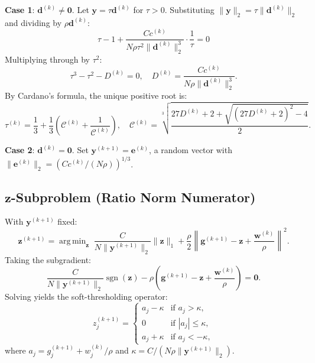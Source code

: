 \documentclass{uai2026} %
\theoremstyle{definition}
\theoremstyle{remark}
\newcommand{\bz}{\mathbf{z}}
\newcommand{\bg}{\mathbf{g}}
\newcommand{\bw}{\mathbf{w}}
\newcommand{\by}{\mathbf{y}}
\newcommand{\bd}{\mathbf{d}}
\newcommand{\be}{\mathbf{e}}
\DeclareMathOperator{\sgn}{sgn}
\DeclareMathOperator*{\argmin}{arg\,min}
\begin{document}
\textbf{Case 1}: $\bd^{(k)} \neq \mathbf{0}$.
Let $\by = \tau\bd^{(k)}$ for $\tau > 0$.
Substituting $\lVert\by\rVert_2 = \tau\lVert\bd^{(k)}\rVert_2$ and dividing by $\rho\bd^{(k)}$:
\begin{equation}
    \tau - 1 + \frac{Cc^{(k)}}{N\rho\tau^2\lVert\bd^{(k)}\rVert_2^3}\cdot\frac{1}{\tau} = 0
\end{equation}
Multiplying through by $\tau^2$:
\begin{equation}
    \tau^3 - \tau^2 - D^{(k)} = 0,\quad D^{(k)} = \frac{Cc^{(k)}}{N\rho\lVert\bd^{(k)}\rVert_2^3}.
\end{equation}
By Cardano's formula, the unique positive root is:
\begin{equation}
    \tau^{(k)} = \frac{1}{3} + \frac{1}{3}\left(\mathcal{C}^{(k)} + \frac{1}{\mathcal{C}^{(k)}}\right),
    \quad \mathcal{C}^{(k)} = \sqrt[3]{\frac{27D^{(k)}+2+\sqrt{(27D^{(k)}+2)^2-4}}{2}}.
\end{equation}

\textbf{Case 2}: $\bd^{(k)} = \mathbf{0}$.
Set $\by^{(k+1)} = \be^{(k)}$, a random vector with $\lVert\be^{(k)}\rVert_2 = (Cc^{(k)}/(N\rho))^{1/3}$.

\subsection{$\bz$-Subproblem (Ratio Norm Numerator)}

With $\by^{(k+1)}$ fixed:
\begin{equation}
    \bz^{(k+1)} = \argmin_{\bz}\;\frac{C}{N\lVert\by^{(k+1)}\rVert_2}\lVert\bz\rVert_1
    + \frac{\rho}{2}\left\lVert\bg^{(k+1)} - \bz + \frac{\bw^{(k)}}{\rho}\right\rVert^2.
\end{equation}
Taking the subgradient:
\begin{equation}
    \frac{C}{N\lVert\by^{(k+1)}\rVert_2}\sgn(\bz)
    - \rho\left(\bg^{(k+1)} - \bz + \frac{\bw^{(k)}}{\rho}\right) = \mathbf{0}.
\end{equation}
Solving yields the soft-thresholding operator:
\begin{equation}
    z_j^{(k+1)} = \begin{cases}
    a_j - \kappa & \text{if } a_j > \kappa, \\
    0 & \text{if } |a_j| \leq \kappa, \\
    a_j + \kappa & \text{if } a_j < -\kappa,
    \end{cases}
\end{equation}
where $a_j = g_j^{(k+1)} + w_j^{(k)}/\rho$ and $\kappa = C/(N\rho\lVert\by^{(k+1)}\rVert_2)$.
\end{document}

